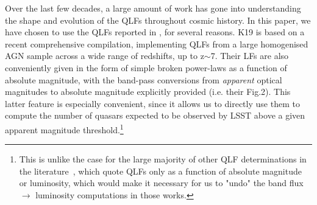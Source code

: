 \documentclass[fleqn,usenatbib]{mnras}
\begin{document}
Over the last few decades, a large amount of work has gone into understanding the shape and evolution of the QLFs throughout cosmic history. In this paper, we have chosen to use the QLFs reported in \citet[][hereafter K19]{Kulkarni2019}, for several reasons. K19 is based on a recent comprehensive compilation, implementing QLFs from a large homogenised AGN sample across a wide range of redshifts, up to z$\sim$7. Their LFs are also conveniently given in the form of simple broken power-laws  as a function of absolute magnitude, with the band-pass conversions from {\it apparent} optical magnitudes to absolute magnitude explicitly provided (i.e. their Fig.2). This latter feature is especially convenient,  since it allows us to directly use them to compute the number of quasars expected to be observed by LSST above a given apparent magnitude threshold.\footnote{This is unlike the case for the large majority of other QLF determinations in the literature~\citep[e.g.][and references therein]{Shen+2020}, which quote QLFs only as a function of absolute magnitude or luminosity, which would make it necessary for us to "undo" the band flux $\rightarrow$ luminosity computations in those works.}
\end{document}
